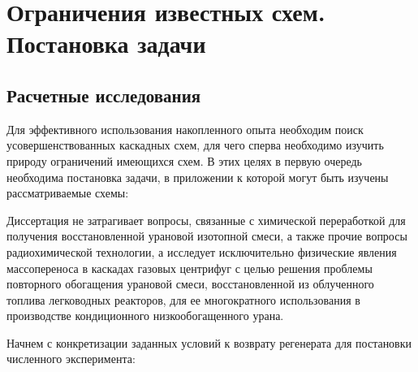 \chapter{Ограничения известных схем. Постановка задачи}\label{ch:ch2}




\section{Расчетные исследования}

Для эффективного использования накопленного опыта необходим поиск усовершенствованных каскадных схем, для чего сперва необходимо изучить природу ограничений имеющихся схем. В этих целях в первую очередь необходима постановка задачи, в приложении к которой могут быть изучены рассматриваемые схемы:


Диссертация не затрагивает вопросы, связанные с химической переработкой для получения восстановленной урановой изотопной смеси, а также прочие вопросы радиохимической технологии, а исследует исключительно физические явления массопереноса в каскадах газовых центрифуг с целью решения проблемы повторного обогащения урановой смеси, восстановленной из облученного топлива легководных реакторов, для ее многократного использования в производстве кондиционного низкообогащенного урана. 

Начнем с конкретизации заданных условий к возврату регенерата для постановки численного эксперимента:

